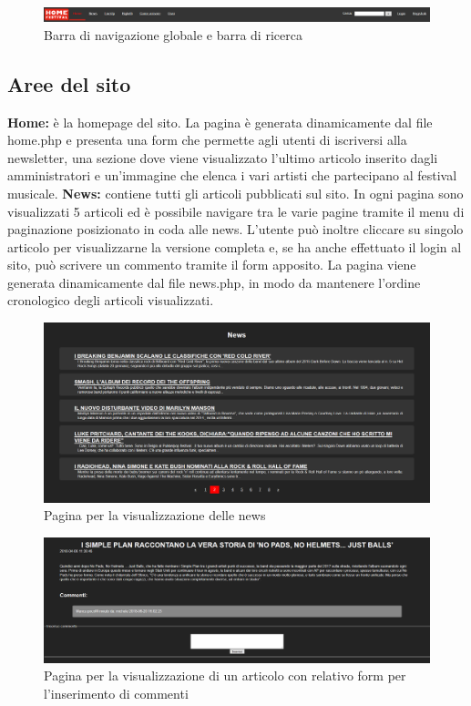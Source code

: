 \documentclass[10pt, a4paper]{article}
\begin{document}
\begin{figure}[h!]
  \centering
  \includegraphics[width=1\textwidth]{Images/navbar.png}
  \caption{Barra di navigazione globale e barra di ricerca}
  \label{fig:navbar}
\end{figure}

\subsection{Aree del sito}
\textbf{Home: }è la homepage del sito. La pagina è generata dinamicamente dal file home.php e presenta una form che permette agli utenti di iscriversi alla newsletter, una sezione dove viene visualizzato l'ultimo articolo inserito dagli amministratori e un'immagine che elenca i vari artisti che partecipano al festival musicale.
\newline \textbf{News: }contiene tutti gli articoli pubblicati sul sito. In ogni pagina sono visualizzati 5 articoli ed è possibile navigare tra le varie pagine tramite il menu di paginazione posizionato in coda alle news. L'utente può inoltre cliccare su singolo articolo per visualizzarne la versione completa e, se ha anche effettuato il login al sito, può scrivere un commento tramite il form apposito. La pagina viene generata dinamicamente dal file news.php, in modo da mantenere l'ordine cronologico degli articoli visualizzati.
\begin{figure}[h!]
  \centering
  \includegraphics[width=1\textwidth]{Images/news.png}
  \caption{Pagina per la visualizzazione delle news}
  \label{fig:news}
\end{figure}
\begin{figure}[h!]
  \centering
  \includegraphics[width=1\textwidth]{Images/articolo.png}
  \caption{Pagina per la visualizzazione di un articolo con relativo form per l'inserimento di commenti}
  \label{fig:articolo}
\end{figure}
\end{document}
